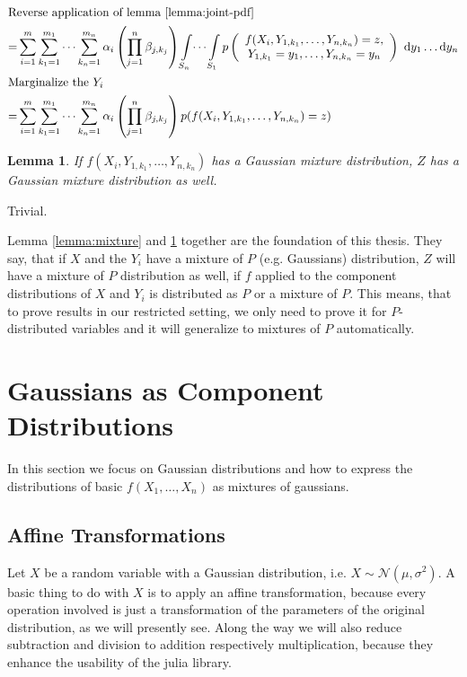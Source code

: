 \documentclass[11pt,a4paper]{book}
\newtheorem{lemma}{Lemma}
\newcommand{\ontopof}[2]{
  \begin{array}{c}
    #1,\\#2
  \end{array}
}
\begin{document}
\begin{proof2}
\begin{align*}
    \intertext{Reverse application of lemma \ref{lemma:joint-pdf}}
    = & \sum_{i = 1}^{m} \sum_{k_{1} = 1}^{m_{1}} \dots \sum_{k_{n} = 1}^{m_{n}} \alpha_{i} \left( \prod_{j = 1}^{n} \beta_{j,k_{j}} \right) \int\limits_{S_{n}} \dots \int\limits_{S_{1}} p\left( \ontopof{f(X_{i}, Y_{1,k_{1}}, \dots, Y_{n,k_{n}}) = z}{Y_{1,k_{1}} = y_{1}, \dots, Y_{n,k_{n}} = y_{n}} \right)~\mathrm{d}y_{1}\dots \mathrm{d}y_{n}\\
    \intertext{Marginalize the $Y_{i}$}
    = & \sum_{i = 1}^{m} \sum_{k_{1} = 1}^{m_{1}} \dots \sum_{k_{n} = 1}^{m_{n}} \alpha_{i} \left( \prod_{j = 1}^{n} \beta_{j,k_{j}} \right) p(f(X_{i}, Y_{1,k_{1}}, \dots, Y_{n,k_{n}}) = z)
  \end{align*}
\end{proof2}

\begin{lemma}
  \label{lemma:components}
  If $f(X_{i}, Y_{1,k_{1}}, \dots, Y_{n,k_{n}})$ has a Gaussian mixture
  distribution, $Z$ has a Gaussian mixture distribution as well.
\end{lemma}
\begin{proof2}
  Trivial.
\end{proof2}

Lemma \ref{lemma:mixture} and \ref{lemma:components} together are the foundation
of this thesis. They say, that if $X$ and the $Y_{i}$ have a mixture of $P$
(e.g. Gaussians) distribution, $Z$ will have a mixture of $P$ distribution as
well, if $f$ applied to the component distributions of $X$ and $Y_{i}$ is
distributed as $P$ or a mixture of $P$. This means, that to prove results in our
restricted setting, we only need to prove it for $P$-distributed variables and
it will generalize to mixtures of $P$ automatically.

\section{Gaussians as Component Distributions}
\label{sec:gaussians}

In this section we focus on Gaussian distributions and how to express the
distributions of basic $f(X_{1}, \dots, X_{n})$ as mixtures of gaussians.

\subsection{Affine Transformations}
\label{sec:affine-transforms}

Let $X$ be a random variable with a Gaussian distribution, i.e.
$X \sim \mathcal{N}(\mu, \sigma^{2})$. A basic thing to do with $X$ is to apply
an affine transformation, because every operation involved is just a
transformation of the parameters of the original distribution, as we will
presently see. Along the way we will also reduce subtraction and division to
addition respectively multiplication, because they enhance the usability of the
julia library.
\end{document}
